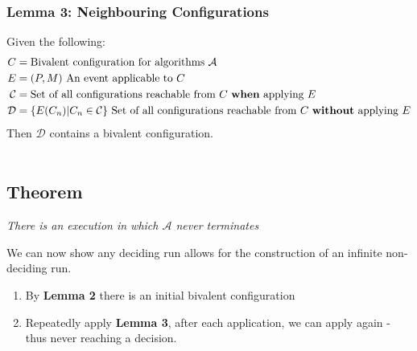
\subsubsection{Lemma 3: Neighbouring Configurations}
Given the following:
\[\begin{split}
    C & = \text{Bivalent configuration for algorithms } \mathcal{A} \\
    E & = (P, M)  \text{ An event applicable to } C \\
    \mathcal{C} & = \text{Set of all configurations reachable from } C \text{ \textbf{when} applying } E \\
    \mathcal{D} & = \{E(C_n) | C_n \in \mathcal{C}\}  \text{ Set of all configurations reachable from } C \text{ \textbf{without} applying } E \\
\end{split}\]
Then $\mathcal{D}$ contains a bivalent configuration. 
\\ \toimprove
\\ \unfinished

\subsection{Theorem}
\centerline{\textit{There is an execution in which $\mathcal{A}$ never terminates}}
We can now show any deciding run allows for the construction of an infinite non-deciding run.
\begin{enumerate}
    \item By \textbf{Lemma 2} there is an initial bivalent configuration
    \item Repeatedly apply \textbf{Lemma 3}, after each application, we can apply again - thus never reaching a decision. 
\end{enumerate}

